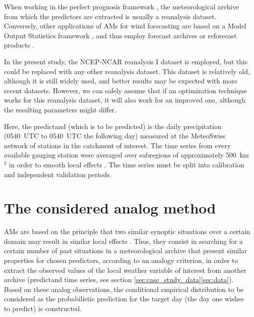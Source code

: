 \documentclass{ametsoc}
\begin{document}
When working in the perfect prognosis framework \citep{Klein1963}, the meteorological archive from which the predictors are extracted is usually a reanalysis dataset. Conversely, other applications of AMs for wind forecasting are based on a Model Output Statistics framework \citep[MOS, see][]{Glahn1972}, and thus employ forecast archives or reforecast products \citep[e.g.,][]{DelleMonache2013, DelleMonache2011, Alessandrini2015, Junk2015, Junk2015c}.

In the present study, the NCEP-NCAR reanalysis I dataset \citep[six-hourly, 17 pressure levels at a resolution of 2.5\degree, see][]{Kalnay1996} is employed, but this could be replaced with any other reanalysis dataset. This dataset is relatively old, although it is still widely used, and better results may be expected with more recent datasets. However, we can safely assume that if an optimization technique works for this reanalysis dataset, it will also work for an improved one, although the resulting parameters might differ.

Here, the predictand (which is to be predicted) is the daily precipitation (0540~UTC to 0540~UTC the following day) measured at the MeteoSwiss network of stations in the catchment of interest. The time series from every available gauging station were averaged over subregions of approximately 500~km$^{2}$ \citep[see][for details]{Horton2012a} in order to smooth local effects \citep{Obled2002, Marty2012}. The time series must be split into calibration and independent validation periods.


\section{The considered analog method}
\label{sec:am}

AMs are based on the principle that two similar synoptic situations over a certain domain may result in similar local effects \citep{Lorenz1956, Lorenz1969}. Thus, they consist in searching for a certain number of past situations in a meteorological archive that present similar properties for chosen predictors, according to an analogy criterion, in order to extract the observed values of the local weather variable of interest from another archive (predictand time series, see section \ref{sec:case_study_data}\ref{sec:data}). Based on these analog observations, the conditional empirical distribution to be considered as the probabilistic prediction for the target day (the day one wishes to predict) is constructed.
\end{document}
